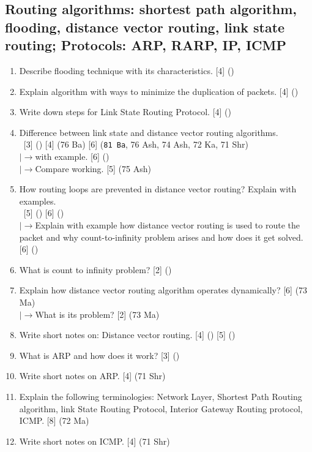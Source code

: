\documentclass[12pt]{article}
\newcommand{\lb}{\\$\left|\rightarrow\right.$}
\newcommand{\enter}{\\\textcolor{white}{1}}
\begin{document}
	\subsection{Routing algorithms: shortest path algorithm, flooding, distance vector routing, link state routing; Protocols: ARP, RARP, IP, ICMP}
		\begin{enumerate}[noitemsep, topsep=0pt]
			\item Describe flooding technique with its characteristics. \hfill [4] ()

			\item Explain algorithm with ways to minimize the duplication of packets. \hfill [4] ()

			\item Write down steps for Link State Routing Protocol. \hfill [4] ()

			\item Difference between link state and distance vector routing algorithms.
			\enter\hfill [3] () [4] (76 Ba) [6] (\texttt{81 Ba}, 76 Ash, 74 Ash, 72 Ka, 71 Shr)
			\lb with example. \hfill [6] ()
			\lb Compare working. \hfill [5] (75 Ash)

			\item How routing loops are prevented in distance vector routing? Explain with examples. 
			\enter\hfill [5] () [6] ()
			\lb Explain with example how distance vector routing is used to route the packet and why count-to-infinity problem arises and how does it get solved. \hspace{5.5cm} [6] ()

			\item What is count to infinity problem? \hfill [2] ()

			\item Explain how distance vector routing algorithm operates dynamically? \hfill [6] (73 Ma)
			\lb What is its problem? \hfill [2] (73 Ma)
			
			\item Write short notes on: Distance vector routing. \hfill [4] () [5] ()

			\item What is ARP and how does it work? \hfill [3] ()

			\item Write short notes on ARP. \hfill [4] (71 Shr)

			\item Explain the following terminologies: Network Layer, Shortest Path Routing algorithm, link State Routing Protocol, Interior Gateway Routing protocol, ICMP. \hfill [8] (72 Ma)

			\item Write short notes on ICMP. \hfill [4] (71 Shr)
		\end{enumerate}
\end{document}
